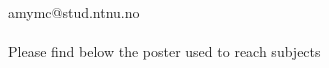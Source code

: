 \paragraph{}
amymc@stud.ntnu.no


\paragraph{}


%
Please find below the poster used to reach subjects
